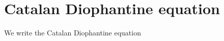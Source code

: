\documentclass[11pt]{article}
\begin{document}






\section{Catalan Diophantine equation}\label{CatalanEquation}


We write the Catalan Diophantine 
equation %
\end{document}
